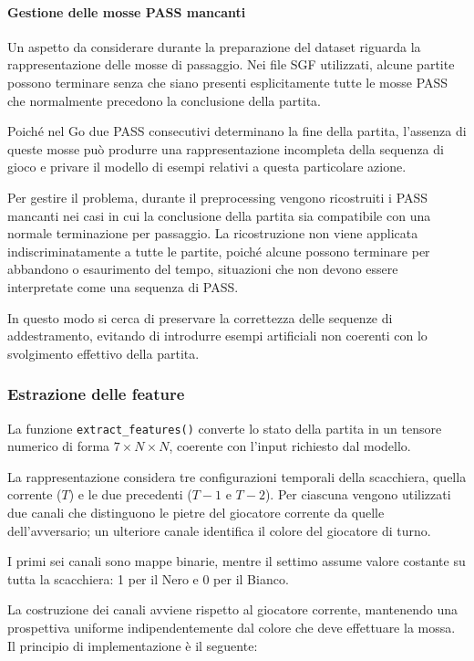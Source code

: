 \paragraph{Gestione delle mosse PASS mancanti}

Un aspetto da considerare durante la preparazione del dataset riguarda la rappresentazione delle mosse di passaggio.
Nei file SGF utilizzati, alcune partite possono terminare senza che siano presenti esplicitamente tutte le mosse PASS che normalmente precedono la conclusione della partita.

Poiché nel Go due PASS consecutivi determinano la fine della partita, l'assenza di queste mosse può produrre una rappresentazione incompleta della sequenza di gioco e privare il modello di esempi relativi a questa particolare azione.

Per gestire il problema, durante il preprocessing vengono ricostruiti i PASS mancanti nei casi in cui la conclusione della partita sia compatibile con una normale terminazione  per passaggio. La ricostruzione non viene applicata indiscriminatamente a tutte le partite, poiché alcune possono terminare per abbandono o esaurimento del tempo, situazioni che non devono essere interpretate come una sequenza di PASS.

In questo modo si cerca di preservare la correttezza delle sequenze di addestramento, evitando di introdurre esempi artificiali non coerenti con lo svolgimento effettivo della partita.

\subsubsection{Estrazione delle feature}

La funzione \texttt{extract\_features()} converte lo stato della partita in un tensore numerico di forma \(7\times N\times N\), coerente con l'input richiesto dal modello.

La rappresentazione considera tre configurazioni temporali della scacchiera, quella corrente (\(T\)) e le due precedenti (\(T-1\) e \(T-2\)). Per ciascuna vengono utilizzati due canali che distinguono le pietre del giocatore corrente da quelle dell'avversario; un ulteriore canale identifica il colore del giocatore di turno.

I primi sei canali sono mappe binarie, mentre il settimo assume valore costante su tutta la scacchiera: 1 per il Nero e 0 per il Bianco.

La costruzione dei canali avviene rispetto al giocatore corrente, mantenendo una prospettiva uniforme indipendentemente dal colore che deve effettuare la mossa. Il principio di implementazione è il seguente:

